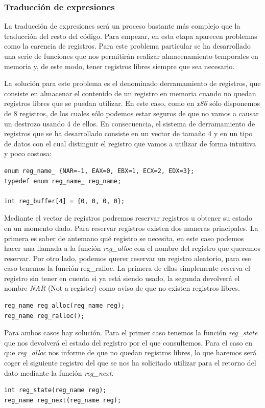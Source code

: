 \documentclass[a4paper,10pt]{article}
\begin{document}
\subsubsection{Traducción de expresiones}

La traducción de expresiones será un proceso bastante más complejo que la traducción del resto del código. Para empezar, en esta etapa aparecen problemas como la carencia de registros. Para este problema particular se ha desarrollado una serie de funciones que nos permitirán realizar almacenamiento temporales en memoria y, de este modo, tener registros libres siempre que sea necesario.

La solución para este problema es el denominado derramamiento de registros, que consiste en almacenar el contenido de un registro en memoria cuando no quedan registros libres que se puedan utilizar. En este caso, como en \textit{x86} sólo disponemos de 8 registros, de los cuales sólo podemos estar seguros de que no vamos a causar un destrozo usando 4 de ellos. En consecuencia, el sistema de derramamiento de registros que se ha desarrollado consiste en un vector de tamaño 4 y en un tipo de datos con el cual distinguir el registro que vamos a utilizar de forma intuitiva y poco costosa:

\begin{lstlisting}
enum reg_name_ {NAR=-1, EAX=0, EBX=1, ECX=2, EDX=3};
typedef enum reg_name_ reg_name;

int reg_buffer[4] = {0, 0, 0, 0};
\end{lstlisting}

Mediante el vector de registros podremos reservar registros u obtener su estado en un momento dado. Para reservar registros existen dos maneras principales. La primera es saber de antemano qué registro se necesita, en este caso podemos hacer una llamada a la función \textit{reg\_alloc} con el nombre del registro que queremos reservar. Por otro lado, podemos querer reservar un registro aleatorio, para ese caso tenemos la función reg\_ralloc. La primera de ellas simplemente reserva el registro sin tener en cuenta si ya está siendo usado, la segunda devolverá el nombre \textit{NAR} (Not a register) como aviso de que no existen registros libres.
\begin{lstlisting}
reg_name reg_alloc(reg_name reg);
reg_name reg_ralloc();
\end{lstlisting}

Para ambos casos hay solución. Para el primer caso tenemos la función \textit{reg\_state} que nos devolverá el estado del registro por el que consultemos. Para el caso en que \textit{reg\_alloc} nos informe de que no quedan registros libres, lo que haremos será coger el siguiente registro del que se nos ha solicitado utilizar para el retorno del dato mediante la función \textit{reg\_next}.
\begin{lstlisting}
int reg_state(reg_name reg);
reg_name reg_next(reg_name reg);
\end{lstlisting}
\end{document}
